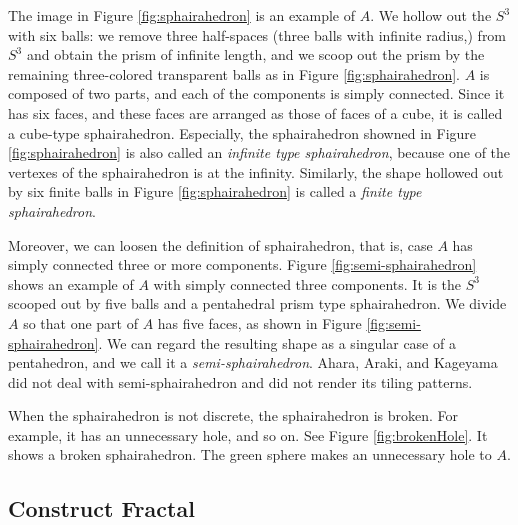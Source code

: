 \documentclass[suppldata, dvipdfmx]{interact}
\theoremstyle{plain}%
\theoremstyle{definition}
\theoremstyle{remark}
\theoremstyle{problemstyle}
\begin{document}
The image in Figure \ref{fig:sphairahedron}
is an example of $A$.
We hollow out the $S^3$ with six balls: we remove three half-spaces
(three balls with infinite radius,) from $S^3$ and obtain the prism of
infinite length, and we scoop out the prism by the remaining
three-colored transparent balls as in Figure
\ref{fig:sphairahedron}.
$A$ is composed of two parts, and each of the components is simply connected.
Since it has six faces, and these faces are arranged as those of faces of
a cube, it is called a cube-type sphairahedron.
Especially, the sphairahedron showned in Figure 
\ref{fig:sphairahedron}
is also called an \textit{infinite type sphairahedron},
because one of the vertexes of the sphairahedron is at the infinity.
Similarly, the shape hollowed out by six finite balls in Figure
\ref{fig:sphairahedron} is called a
\textit{finite type sphairahedron}.

Moreover, we can loosen the definition of sphairahedron,
that is, case $A$ has simply connected three or more components.
Figure \ref{fig:semi-sphairahedron} shows an
example of $A$ with simply connected three components.
It is the $S^3$ scooped out by five balls and a pentahedral prism type
sphairahedron.
We divide $A$ so that one part of $A$ has five faces, as shown in
Figure \ref{fig:semi-sphairahedron}.
We can regard the resulting shape as a singular case of a pentahedron,
and we call it a \textit{semi-sphairahedron}.
Ahara, Araki, and Kageyama did not deal with semi-sphairahedron and
did not render its tiling patterns.

When the sphairahedron is not discrete, the sphairahedron is broken.
For example, it has an unnecessary hole, and so on.
See Figure \ref{fig:brokenHole}. It shows a broken sphairahedron.
The green sphere makes an unnecessary hole to $A$.

\subsection{Construct Fractal}\label{constructFractal}
\end{document}
